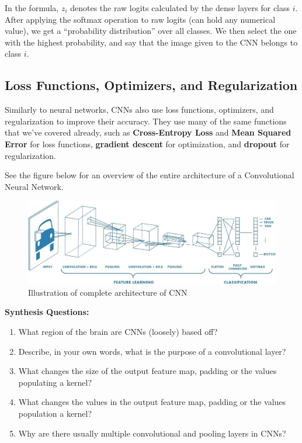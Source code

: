         In the formula, $z_i$ denotes the raw logits calculated by the dense layers for class $i$. After applying the softmax operation to raw logits (can hold any numerical value), we get a ``probability distribution'' over all classes. We then select the one with the highest probability, and say that the image given to the CNN belongs to class $i$.

        \subsection{Loss Functions, Optimizers, and Regularization}
        Similarly to neural networks, CNNs also use loss functions, optimizers, and regularization to improve their accuracy. They use many of the same functions that we've covered already, such as \textbf{Cross-Entropy Loss} and \textbf{Mean Squared Error} for loss functions, \textbf{gradient descent} for optimization, and \textbf{dropout} for regularization. 

        See the figure below for an overview of the entire architecture of a Convolutional Neural Network.  
        
        \begin{figure}[H]
            \centering
            \includegraphics[width=1\linewidth]{cv/full_cnn.png}
            \caption{Illustration of complete architecture of CNN}
            \label{fig:full_cnn}
        \end{figure}

\vspace{10bp}
\begin{questionbox}
    \textbf{Synthesis Questions:}
    \begin{enumerate}    
        \item What region of the brain are CNNs (loosely) based off?
        \item Describe, in your own words, what is the purpose of a convolutional layer?
        \item What changes the size of the output feature map, padding or the values populating a kernel?
        \item What changes the values in the output feature map, padding or the values population a kernel?
        \item Why are there usually multiple convolutional and pooling layers in CNNs?
    \end{enumerate}
    \vspace{1bp}
\end{questionbox}

